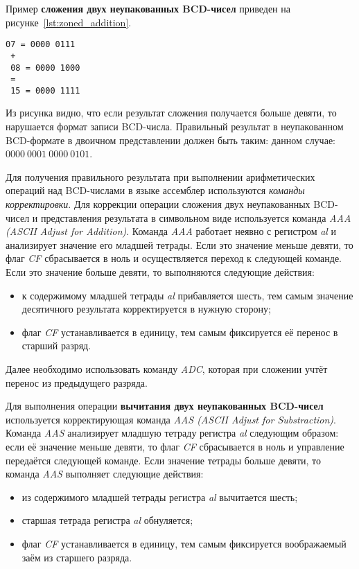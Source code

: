 \pagebreak

Пример \textbf{сложения двух неупакованных BCD-чисел} приведен на рисунке~\ref{lst:zoned_addition}.

\begin{lstlisting}[caption=Пример сложения двух неупакованных BCD-чисел,label=lst:zoned_addition]
 07 = 0000 0111
 +
 08 = 0000 1000
 =
 15 = 0000 1111
\end{lstlisting}

Из рисунка видно, что если результат сложения получается больше
девяти, то нарушается формат записи BCD-числа.
Правильный результат в неупакованном
BCD-формате в двоичном представлении должен быть таким: данном случае:
$ 0000~0001~0000~0101 $.

Для получения правильного результата при выполнении арифметических операций над BCD-числами
в языке ассемблер используются \textit{команды корректировки}. Для коррекции операции сложения
двух неупакованных BCD-чисел и представления результата в символьном виде используется
команда \textit{AAA (ASCII Adjust for Addition)}. Команда \textit{AAA} работает неявно
с регистром \textit{al} и анализирует значение его младшей тетрады.
Если это значение меньше девяти, то флаг \textit{CF} сбрасывается в ноль и
осуществляется переход к следующей команде. Если это значение больше девяти, то
выполняются следующие действия:
\begin{itemize}
  \item к содержимому младшей тетрады \textit{al} прибавляется шесть, тем самым значение
  десятичного результата корректируется в нужную сторону;
  \item флаг \textit{CF} устанавливается в единицу, тем самым фиксируется её
  перенос в старший разряд.
\end{itemize}

Далее необходимо использовать команду \textit{ADC}, которая при сложении учтёт перенос
из предыдущего разряда.

Для выполнения операции \textbf{вычитания двух неупакованных BCD-чисел} используется
корректирующая команда \textit{AAS (ASCII Adjust for Substraction)}. Команда \textit{AAS}
анализирует младшую тетраду регистра \textit{al} следующим образом: если её значение
меньше девяти, то флаг \textit{CF} сбрасывается в ноль и управление передаётся
следующей команде. Если значение тетрады больше девяти, то команда \textit{AAS}
выполняет следующие действия:
\begin{itemize}
  \item из содержимого младшей тетрады регистра \textit{al} вычитается шесть;
  \item старшая тетрада регистра \textit{al} обнуляется;
  \item флаг \textit{CF} устанавливается в единицу, тем самым фиксируется воображаемый
  заём из старшего разряда.
\end{itemize}


